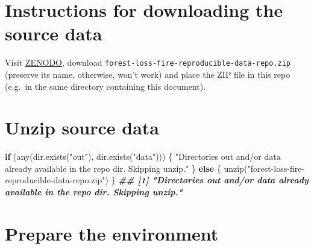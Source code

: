 \documentclass[10pt,landscape,a3paper]{article}
\newenvironment{Shaded}{\begin{snugshade}}{\end{snugshade}}
\newcommand{\ControlFlowTok}[1]{\textcolor[rgb]{0.13,0.29,0.53}{\textbf{#1}}}
\newcommand{\DocumentationTok}[1]{\textcolor[rgb]{0.56,0.35,0.01}{\textbf{\textit{#1}}}}
\newcommand{\FunctionTok}[1]{\textcolor[rgb]{0.00,0.00,0.00}{#1}}
\newcommand{\NormalTok}[1]{#1}
\newcommand{\StringTok}[1]{\textcolor[rgb]{0.31,0.60,0.02}{#1}}
\begin{document}
\hypertarget{instructions-for-downloading-the-source-data}{%
\section{Instructions for downloading the source
data}\label{instructions-for-downloading-the-source-data}}

Visit \href{https://zenodo.org/record/5681481}{ZENODO}, download
\texttt{forest-loss-fire-reproducible-data-repo.zip} (preserve its name,
otherwise, won't work) and place the ZIP file in this repo (e.g.~in the
same directory containing this document).

\hypertarget{unzip-source-data}{%
\section{Unzip source data}\label{unzip-source-data}}

\begin{Shaded}
\begin{Highlighting}[]
\ControlFlowTok{if}\NormalTok{ (}\FunctionTok{any}\NormalTok{(}\FunctionTok{dir.exists}\NormalTok{(}\StringTok{"out"}\NormalTok{), }\FunctionTok{dir.exists}\NormalTok{(}\StringTok{"data"}\NormalTok{))) \{}
    \StringTok{"Directories \textquotesingle{}out\textquotesingle{} and/or \textquotesingle{}data\textquotesingle{} already available in the repo dir. Skipping unzip."}
\NormalTok{\} }\ControlFlowTok{else}\NormalTok{ \{}
    \FunctionTok{unzip}\NormalTok{(}\StringTok{"forest{-}loss{-}fire{-}reproducible{-}data{-}repo.zip"}\NormalTok{)}
\NormalTok{\}}
\DocumentationTok{\#\# [1] "Directories \textquotesingle{}out\textquotesingle{} and/or \textquotesingle{}data\textquotesingle{} already available in the repo dir. Skipping unzip."}
\end{Highlighting}
\end{Shaded}

\hypertarget{prepare-the-environment}{%
\section{Prepare the environment}\label{prepare-the-environment}}
\end{document}
